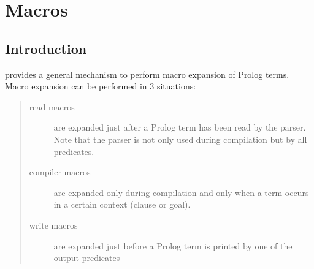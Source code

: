 %
%
%
%
%
%
%
%

\chapter{{\eclipse} Macros}
\label{chapmacros}

\section{Introduction}
{\eclipse} provides a general mechanism to perform macro expansion
of Prolog terms.
Macro expansion can be performed in 3 situations:
\begin{quote}
\begin{description}

\item[read macros]
  are expanded just after a Prolog term has been read by the
  {\eclipse} parser. Note that the parser is not only used during
  compilation but by all
  predicates.

\item[compiler macros]
  are expanded only during compilation and only when a term occurs
  in a certain context (clause or goal).

\item[write macros]
  are expanded just before a Prolog term is printed by one of the
  output predicates

\end{description}
\end{quote}

